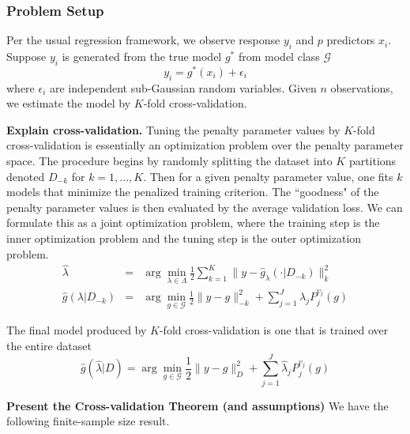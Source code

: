 \documentclass[12pt]{article}
\begin{document}
\subsubsection{Problem Setup}
Per the usual regression framework, we observe response $y_i$ and $p$ predictors $x_i$. Suppose $y_i$ is generated from the true model $g^*$ from model class $\mathcal{G}$
\begin{equation}
y_i = g^*(x_i) + \epsilon_i
\end{equation}
where $\epsilon_i$ are independent sub-Gaussian random variables. Given $n$ observations, we estimate the model by $K$-fold cross-validation.

\textbf{Explain cross-validation.}
Tuning the penalty parameter values by $K$-fold cross-validation is essentially an optimization problem over the penalty parameter space. The procedure begins by randomly splitting the dataset into $K$ partitions denoted $D_{-k}$ for $k=1,...,K$. Then for a given penalty parameter value, one fits $k$ models that minimize the penalized training criterion. The ``goodness" of the penalty parameter values is then evaluated by the average validation loss. We can formulate this as a joint optimization problem, where the training step is the inner optimization problem and the tuning step is the outer optimization problem.
\begin{eqnarray}
\hat{\lambda} &=& \arg\min_{\lambda\in\Lambda} \frac{1}{2} \sum_{k=1}^K  \| y-\hat{g}_{\lambda}(\cdot| D_{-k}) \|_{k}^{2} \\
\hat{g}(\lambda | D_{-k})&=&\arg\min_{g\in\mathcal{G}} \frac{1}{2} \| y-g \|_{-k}^{2} + \sum_{j=1}^J \lambda_j P_j^{v_j}(g)
\end{eqnarray}

The final model produced by $K$-fold cross-validation is one that is trained over the entire dataset
\begin{equation}
\hat{g}(\hat{\lambda} | D) = \arg\min_{g\in\mathcal{G}} \frac{1}{2} \| y-g \|_{D}^{2} + \sum_{j=1}^J \hat{\lambda}_j P_j^{v_j}(g)
\end{equation}

\textbf{Present the Cross-validation Theorem (and assumptions)}
We have the following finite-sample size result.
\end{document}
